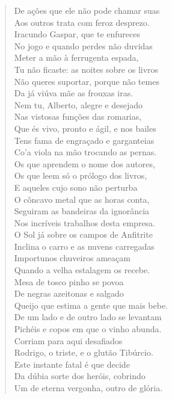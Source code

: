 \begin{verse}
De ações que ele não pode chamar suas\\
Aos outros trata com feroz desprezo.\\ 
Iracundo Gaspar, que te enfureces\\
No jogo e quando perdes não duvidas\\
Meter a mão à ferrugenta espada,\\
Tu não ficaste: as noites sobre os livros\\
Não queres suportar, porque não temes\\
Da já viúva mãe as frouxas iras.\\
Nem tu, Alberto, alegre e desejado\\
Nas vistosas funções das romarias,\\
Que és vivo, pronto e ágil, e nos bailes\\
Tens fama de engraçado e garganteias\\
Co'a viola na mão trocando as pernas.\\ 
Os que aprendem o nome dos autores,\\
Os que leem só o prólogo dos livros,\\
E aqueles cujo sono não perturba\\
O côncavo metal que as horas conta,\\
Seguiram as bandeiras da ignorância\\
Nos incríveis trabalhos desta empresa. \\[10pt] 


O Sol já sobre os campos de Anfitrite\\		\index{\Anfit}
Inclina o carro e as nuvens carregadas\\	\index{\Carro}
Importunos chuveiros ameaçam\\
Quando a velha estalagem os recebe. \\[10pt]


Mesa de tosco pinho se povoa\\
De negras azeitonas e salgado\\
Queijo que estima a gente que mais bebe.\\
De um lado e de outro lado se levantam\\
Pichéis e copos em que o vinho abunda.\\
Corriam para aqui desafiados\\
Rodrigo, o triste, e o glutão Tibúrcio.\\
Este instante fatal é que decide\\
Da dúbia sorte dos heróis, cobrindo\\
Um de eterna vergonha, outro de glória. \\[10pt]



\end{verse}
